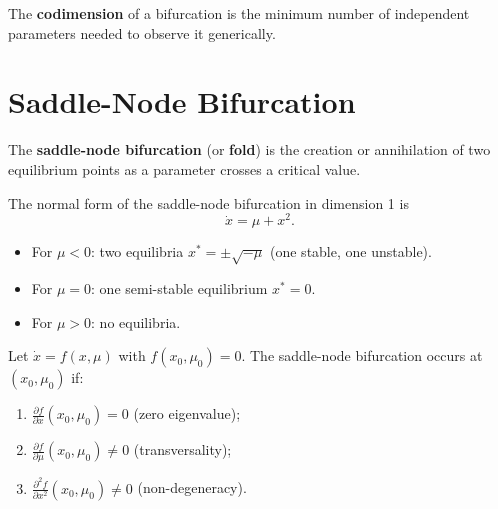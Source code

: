 \begin{definition}[Codimension]
The \textbf{codimension} of a bifurcation is the minimum number of
independent parameters needed to observe it generically.
\end{definition}

\section{Saddle-Node Bifurcation}

\begin{definition}
The \textbf{saddle-node bifurcation} (or \textbf{fold}) is the creation or
annihilation of two equilibrium points as a parameter crosses a critical value.
\end{definition}

\begin{theorem}
\label{thm:saddle-node}
The normal form of the saddle-node bifurcation in dimension 1 is
\[
    \dot{x} = \mu + x^2.
\]
\begin{itemize}
    \item For $\mu < 0$: two equilibria $x^* = \pm\sqrt{-\mu}$ (one stable,
    one unstable).
    \item For $\mu = 0$: one semi-stable equilibrium $x^* = 0$.
    \item For $\mu > 0$: no equilibria.
\end{itemize}
\end{theorem}

\begin{theorem}
Let $\dot{x} = f(x, \mu)$ with $f(x_0, \mu_0) = 0$. The saddle-node
bifurcation occurs at $(x_0, \mu_0)$ if:
\begin{enumerate}
    \item $\frac{\partial f}{\partial x}(x_0, \mu_0) = 0$ (zero eigenvalue);
    \item $\frac{\partial f}{\partial \mu}(x_0, \mu_0) \neq 0$ (transversality);
    \item $\frac{\partial^2 f}{\partial x^2}(x_0, \mu_0) \neq 0$ (non-degeneracy).
\end{enumerate}
\end{theorem}

\begin{center}
\end{center}

